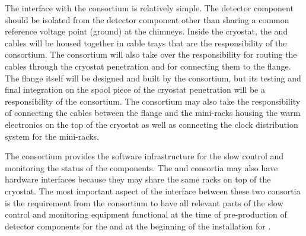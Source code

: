 The interface with the  consortium is relatively simple.
The  detector component should be isolated from the 
detector component other than sharing a common reference 
voltage point (ground) at the chimneys. Inside the cryostat, the 
 and  cables will be housed together in
cable trays that are the responsibility of the 
consortium. The  consortium will also take over
the responsibility for routing the  cables through the
cryostat penetration and for connecting them to the 
flange. The flange itself will be designed and built by the 
consortium, but its testing and final integration on the spool piece
of the cryostat penetration will be a responsibility of the 
consortium. The  consortium may also
take the responsibility of connecting the 
 cables between the flange and the mini-racks housing
the  warm electronics on the top of the cryostat as
well as connecting the clock distribution system for the mini-racks.

The  consortium provides the software infrastructure for the slow
control and monitoring the status of the  components.
The  and  consortia may also have hardware
interfaces because they may share the same racks on top of the
cryostat. The most important aspect of the interface between these
two consortia is the requirement from the  consortium
to have all relevant parts of the slow control and monitoring
equipment functional at the time of pre-production of
detector components for the  and at the beginning
of the installation for . 
